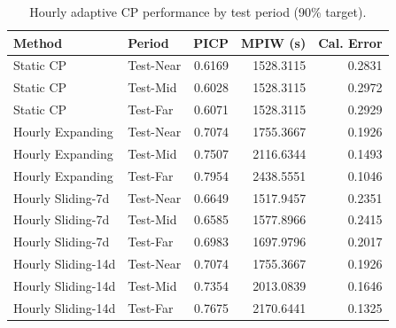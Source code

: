 \begin{table}
\caption{Hourly adaptive CP performance by test period (90\% target).}
\label{tab:t5b2_hourly_by_period}
\begin{tabular}{llrrr}
\toprule
Method & Period & PICP & MPIW (s) & Cal. Error \\
\midrule
Static CP & Test-Near & 0.6169 & 1528.3115 & 0.2831 \\
Static CP & Test-Mid & 0.6028 & 1528.3115 & 0.2972 \\
Static CP & Test-Far & 0.6071 & 1528.3115 & 0.2929 \\
Hourly Expanding & Test-Near & 0.7074 & 1755.3667 & 0.1926 \\
Hourly Expanding & Test-Mid & 0.7507 & 2116.6344 & 0.1493 \\
Hourly Expanding & Test-Far & 0.7954 & 2438.5551 & 0.1046 \\
Hourly Sliding-7d & Test-Near & 0.6649 & 1517.9457 & 0.2351 \\
Hourly Sliding-7d & Test-Mid & 0.6585 & 1577.8966 & 0.2415 \\
Hourly Sliding-7d & Test-Far & 0.6983 & 1697.9796 & 0.2017 \\
Hourly Sliding-14d & Test-Near & 0.7074 & 1755.3667 & 0.1926 \\
Hourly Sliding-14d & Test-Mid & 0.7354 & 2013.0839 & 0.1646 \\
Hourly Sliding-14d & Test-Far & 0.7675 & 2170.6441 & 0.1325 \\
\bottomrule
\end{tabular}
\end{table}
